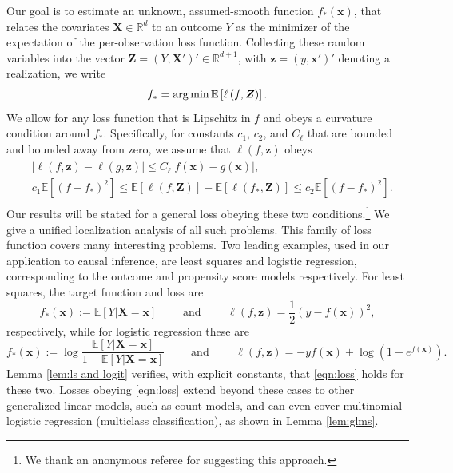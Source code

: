 \documentclass[11pt]{article}
\numberwithin{equation}{section}
\theoremstyle{definition}
\DeclareMathOperator*{\argmin}{arg\,min}
\newcommand{\E}{\mathbb{E}}
\newcommand{\R}{\mathbb{R}}
\def\argmin{\operatornamewithlimits{arg\,min}}
\newcommand{\deq}{:=}
\newcommand{\bz}{\bm{z}}
\newcommand{\bZ}{\bm{Z}}
\newcommand{\bx}{\bm{x}}
\newcommand{\bX}{\bm{X}}
\begin{document}
Our goal is to estimate an unknown, assumed-smooth function $f_*(\bx)$, that relates the covariates $\bX \in \R^d$ to an outcome $Y$ as the minimizer of the expectation of the per-observation loss function. Collecting these random variables into the vector $\bZ = (Y, \bX')' \in \R^{d+1}$, with $\bz = (y, \bx')'$ denoting a realization, we write
\[
f_* = \argmin \E \left[ \ell\left(f, \bZ\right) \right]. 
\]
We allow for any loss function that is Lipschitz in $f$ and obeys a curvature condition around $f_*$. Specifically, for constants $c_1$, $c_2$, and $C_\ell$ that are bounded and bounded away from zero, we assume that $\ell(f,\bz)$ obeys
\begin{align}
	\begin{split}
		\label{eqn:loss}
		& |\ell(f, \bz) - \ell(g, \bz)| \leq C_\ell |f(\bx) - g(\bx)| ,  		\\
		& c_1 \E \left[ (f - f_*)^2 \right]\leq \E [\ell(f, \bZ)] - \E [\ell (f_*, \bZ)] \leq c_2 \E \left[(f - f_*)^2\right].
	\end{split}
\end{align}
Our results will be stated for a general loss obeying these two conditions.\footnote{We thank an anonymous referee for suggesting this approach.} We give a unified localization analysis of all such problems. This family of loss function covers many interesting problems. Two leading examples, used in our application to causal inference, are least squares and logistic regression, corresponding to the outcome and propensity score models respectively. For least squares, the target function and loss are 
\begin{equation}
	\label{eqn:ols}
	f_*(\bx) \deq \E[ Y | \bX = \bx]   		\qquad \text{ and } \qquad  		  \ell\left(f, \bz \right) = \frac{1}{2} (y - f(\bx))^2,
\end{equation}
respectively, while for logistic regression these are
\begin{equation}
	\label{eqn:logit}
	f_*(\bx) \deq\log \frac{\E[Y|\bX = \bx]}{1 - \E[Y|\bX = \bx]}   		\qquad \text{ and } \qquad  		  \ell\left(f, \bz \right) = -y f(\bx) + \log\left( 1 + e^{f(\bx)} \right).
\end{equation}
Lemma \ref{lem:ls and logit} verifies, with explicit constants, that \eqref{eqn:loss} holds for these two. Losses obeying \eqref{eqn:loss} extend beyond these cases to other generalized linear models, such as count models, and can even cover multinomial logistic regression (multiclass classification), as shown in Lemma \ref{lem:glms}.
\end{document}
